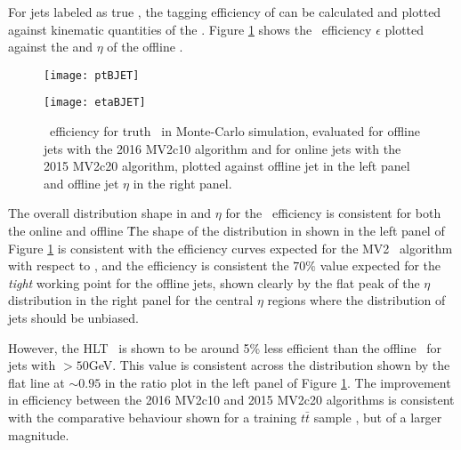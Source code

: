 	For jets labeled as true \bjets, the tagging efficiency of can be calculated and plotted against kinematic quantities of the \bjets. Figure \ref{fig:MC:bjetefficiency} shows the \btag\ efficiency $\epsilon$ plotted against the \pt and $\eta$ of the offline \bjet.

		\begin{figure}[h]
			\centering
			\begin{minipage}[h]{0.48\linewidth}
				\texttt{[image: ptBJET]}

			\end{minipage}
			\quad
			\begin{minipage}[h]{0.48\linewidth}
				\texttt{[image: etaBJET]}
			\end{minipage}
			\caption{\btag\, efficiency for truth \bjets\, in Monte-Carlo simulation, evaluated for offline jets with the 2016 MV2c10 algorithm and for online jets with the 2015 MV2c20 algorithm, plotted against offline jet \pt in the left panel and offline jet $\eta$ in the right panel.}
			\label{fig:MC:bjetefficiency}
		\end{figure}

		The overall distribution shape in \pt and $\eta$ for the \btag\ efficiency is consistent for both the online and offline \bjet\. The shape of the distribution in \pt shown in the left panel of Figure \ref{fig:MC:bjetefficiency} is consistent with the efficiency curves expected for the MV2 \btag\ algorithm with respect to \pt \cite{btagOptimisation}, and the efficiency is consistent the $70\%$ value expected for the \textit{tight} working point for the offline jets, shown clearly by the flat peak of the $\eta$ distribution in the right panel for the central $\eta$ regions where the \pt distribution of jets should be unbiased.

		However, the HLT \btag\, is shown to be around 5\% less efficient than the offline \btag\, for jets with \pt$>50$GeV. This value is consistent across the \pt distribution shown by the flat line at $\sim0.95$ in the ratio plot in the left panel of Figure \ref{fig:MC:bjetefficiency}. The improvement in efficiency between the 2016 MV2c10 and 2015 MV2c20 algorithms is consistent with the comparative behaviour shown for a training $t\bar{t}$ sample \cite{btagOptimisation}, but of a larger magnitude.

